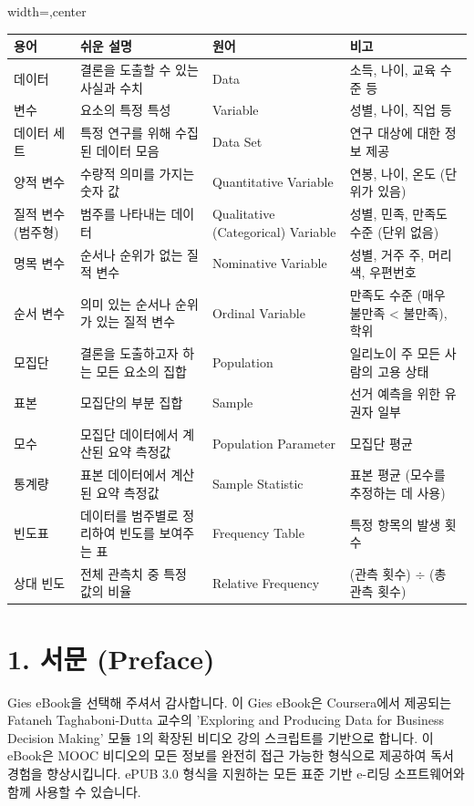 \documentclass[11pt,a4paper]{article}
\begin{document}
\begin{adjustbox}{width=\textwidth,center}
\begin{tabular}{llll}
\toprule
\textbf{용어} & \textbf{쉬운 설명} & \textbf{원어} & \textbf{비고} \\
\midrule
데이터 & 결론을 도출할 수 있는 사실과 수치 & Data & 소득, 나이, 교육 수준 등 \\
변수 & 요소의 특정 특성 & Variable & 성별, 나이, 직업 등 \\
데이터 세트 & 특정 연구를 위해 수집된 데이터 모음 & Data Set & 연구 대상에 대한 정보 제공 \\
양적 변수 & 수량적 의미를 가지는 숫자 값 & Quantitative Variable & 연봉, 나이, 온도 (단위가 있음) \\
질적 변수 (범주형) & 범주를 나타내는 데이터 & Qualitative (Categorical) Variable & 성별, 민족, 만족도 수준 (단위 없음) \\
명목 변수 & 순서나 순위가 없는 질적 변수 & Nominative Variable & 성별, 거주 주, 머리색, 우편번호 \\
순서 변수 & 의미 있는 순서나 순위가 있는 질적 변수 & Ordinal Variable & 만족도 수준 (매우 불만족 < 불만족), 학위 \\
모집단 & 결론을 도출하고자 하는 모든 요소의 집합 & Population & 일리노이 주 모든 사람의 고용 상태 \\
표본 & 모집단의 부분 집합 & Sample & 선거 예측을 위한 유권자 일부 \\
모수 & 모집단 데이터에서 계산된 요약 측정값 & Population Parameter & 모집단 평균 \\
통계량 & 표본 데이터에서 계산된 요약 측정값 & Sample Statistic & 표본 평균 (모수를 추정하는 데 사용) \\
빈도표 & 데이터를 범주별로 정리하여 빈도를 보여주는 표 & Frequency Table & 특정 항목의 발생 횟수 \\
상대 빈도 & 전체 관측치 중 특정 값의 비율 & Relative Frequency & (관측 횟수) $\div$ (총 관측 횟수) \\
\bottomrule
\end{tabular}
\end{adjustbox}

\newpage
\section{1. 서문 (Preface)}

Gies eBook을 선택해 주셔서 감사합니다. 이 Gies eBook은 Coursera에서 제공되는 Fataneh Taghaboni-Dutta 교수의 'Exploring and Producing Data for Business Decision Making' 모듈 1의 확장된 비디오 강의 스크립트를 기반으로 합니다. 이 eBook은 MOOC 비디오의 모든 정보를 완전히 접근 가능한 형식으로 제공하여 독서 경험을 향상시킵니다. ePUB 3.0 형식을 지원하는 모든 표준 기반 e-리딩 소프트웨어와 함께 사용할 수 있습니다.
\end{document}
